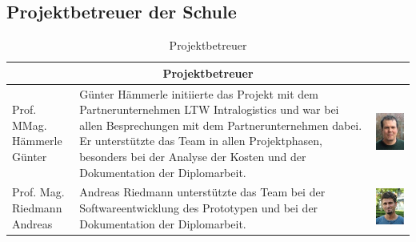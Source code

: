 \subsection{Projektbetreuer der Schule}
\begin{table}[H]
  \centering
  \begin{tabular}{lp{}c}                         \\
    \multicolumn{3}{c}{\textbf{Projektbetreuer}} \\
    \toprule
    \makecell[l]{Prof. MMag.                     \\Hämmerle Günter} & Günter Hämmerle initiierte das Projekt mit dem Partnerunternehmen LTW Intralogistics und war bei allen Besprechungen mit dem Partnerunternehmen dabei. Er unterstützte das Team in allen Projektphasen, besonders bei der Analyse der Kosten und der Dokumentation der Diplomarbeit. & \begin{minipage}{.3\textwidth}\centering\includegraphics{images/günterhämmerle.jpg} \end{minipage} \\
    \midrule
    \makecell[l]{Prof. Mag.                      \\Riedmann Andreas} & Andreas Riedmann unterstützte das Team bei der Softwareentwicklung des Prototypen und bei der Dokumentation der Diplomarbeit. & \begin{minipage}{.3\textwidth}\centering\includegraphics{images/andreasriedmann.jpg} \end{minipage} \\
    \bottomrule
  \end{tabular}
  \caption{Projektbetreuer}
  \label{tab:projektbetreuer}
\end{table}


